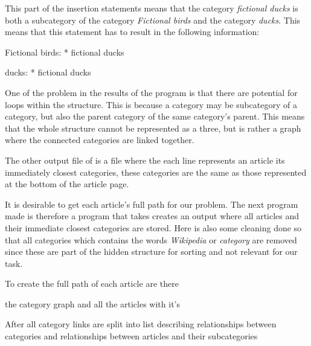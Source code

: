 This part of the insertion statements means that the category \emph{fictional ducks} is both a subcategory of the category \emph{Fictional birds} and the category \emph{ducks}. This means that this statement has to result in the following information: 
\begin{code}
Fictional birds: 
* fictional ducks

ducks:
* fictional ducks
\end{code}

One of the problem in the results of the program is that there are potential for loops within the structure. This is because a category may be subcategory of a category, but also the parent category of the same category's parent. This means that the whole structure cannot be represented as a three, but is rather a graph where the connected categories are linked together. 

The other output file of \catlinkprogram is a file where the each line represents an article its immediately closest categories, these categories are the same as those represented at the bottom of the article page. 

It is desirable to get each article's full path for our problem. The next program made is therefore a program that takes creates an output where all articles and their immediate closest categories are stored. Here is also some cleaning done so that all categories which contains the words \emph{Wikipedia} or \emph{category} are removed since these are part of the hidden structure for sorting and not relevant for our task. 

To create the full path of each article are there 

the category graph and all the articles with it's 


After all category links are split into list describing relationships between categories and relationships between articles and their subcategories 
